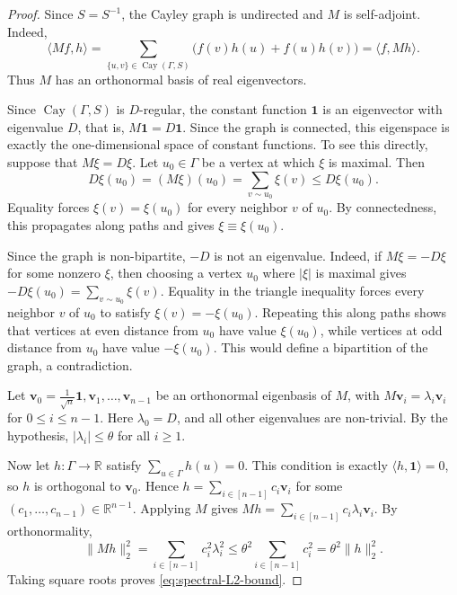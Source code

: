 \documentclass[10pt]{article}
\numberwithin{equation}{section}
\DeclareMathOperator{\Cay}{Cay}
\newcommand{\R}{\mathbb{R}}
\begin{document}
\begin{proof}
Since $S=S^{-1}$, the Cayley graph is undirected and $M$ is self-adjoint. Indeed,
\[
        \langle Mf,h\rangle = \sum_{\{u,v\}\in\Cay(\Gamma,S)} \bigl(f(v)h(u)+f(u)h(v)\bigr) = \langle f,Mh\rangle .
\]
Thus $M$ has an orthonormal basis of real eigenvectors.

Since $\Cay(\Gamma,S)$ is $D$-regular, the constant function $\mathbf 1$ is an eigenvector with eigenvalue $D$, that is, $M\mathbf 1=D\mathbf 1$. Since the graph is connected, this eigenspace is exactly the one-dimensional space of constant functions. To see this directly, suppose that $M\xi=D\xi$. Let $u_0\in\Gamma$ be a vertex at which $\xi$ is maximal. Then
\[
        D\xi(u_0)=(M\xi)(u_0)=\sum_{v\sim u_0}\xi(v)\le D\xi(u_0).
\]
Equality forces $\xi(v)=\xi(u_0)$ for every neighbor $v$ of $u_0$. By connectedness, this propagates along paths and gives $\xi\equiv \xi(u_0)$.

Since the graph is non-bipartite, $-D$ is not an eigenvalue. Indeed, if $M\xi=-D\xi$ for some nonzero $\xi$, then choosing a vertex $u_0$ where $|\xi|$ is maximal gives $-D\xi(u_0)=\sum_{v\sim u_0}\xi(v)$. Equality in the triangle inequality forces every neighbor $v$ of $u_0$ to satisfy $\xi(v)=-\xi(u_0)$. Repeating this along paths shows that vertices at even distance from $u_0$ have value $\xi(u_0)$, while vertices at odd distance from $u_0$ have value $-\xi(u_0)$. This would define a bipartition of the graph, a contradiction.

Let $\mathbf v_0=\frac{1}{\sqrt n}\mathbf 1, \mathbf v_1, \ldots, \mathbf v_{n-1}$ be an orthonormal eigenbasis of $M$, with $M\mathbf v_i=\lambda_i \mathbf v_i$ for $0 \le i \le n-1$. Here $\lambda_0=D$, and all other eigenvalues are non-trivial. By the hypothesis, $|\lambda_i|\le \theta$ for all $i \ge 1$.

Now let $h\colon\Gamma\to\R$ satisfy $\sum_{u\in\Gamma}h(u)=0$. This condition is exactly $\langle h,\mathbf 1\rangle=0$, so $h$ is orthogonal to $\mathbf v_0$. Hence $h=\sum_{i\in[n-1]} c_i \mathbf v_i$ for some $(c_1, \ldots, c_{n-1})\in\R^{n-1}$. Applying $M$ gives $Mh=\sum_{i\in[n-1]} c_i\lambda_i \mathbf v_i$. By orthonormality,
\[
        \|Mh\|_2^2 = \sum_{i\in[n-1]}c_i^2\lambda_i^2 \le \theta^2\sum_{i\in[n-1]}c_i^2 = \theta^2\|h\|_2^2 .
\]
Taking square roots proves \eqref{eq:spectral-L2-bound}.


\end{proof}
\end{document}
